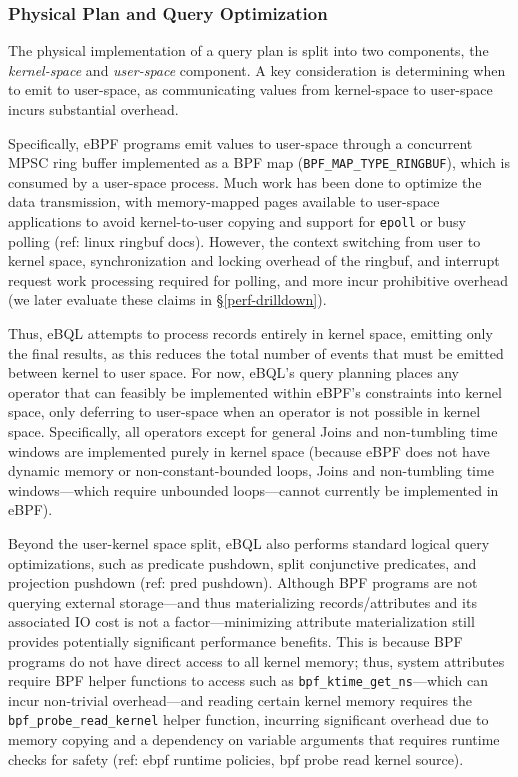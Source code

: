 \subsubsection{Physical Plan and Query Optimization}

The physical implementation of a query plan is split into two components, the \textit{kernel-space}
and \textit{user-space} component. A key consideration is determining when to emit to user-space, as
communicating values from kernel-space to user-space incurs substantial overhead.

Specifically, eBPF programs emit values to user-space through a concurrent MPSC ring buffer
implemented as a BPF map (\texttt{BPF\_MAP\_TYPE\_RINGBUF}), which is consumed by a user-space
process. Much work has been done to optimize the data transmission, with memory-mapped pages
available to user-space applications to avoid kernel-to-user copying and support for \texttt{epoll}
or busy polling (ref: linux ringbuf docs). However, the context switching from user to kernel space,
synchronization and locking overhead of the ringbuf, and interrupt request work processing required
for polling, and more incur prohibitive overhead (we later evaluate these claims in
\S\ref{perf-drilldown}).

Thus, eBQL attempts to process records entirely in kernel space, emitting only the final results, as
this reduces the total number of events that must be emitted between kernel to user space. For now,
eBQL's query planning places any operator that can feasibly be implemented within eBPF's constraints
into kernel space, only deferring to user-space when an operator is not possible in kernel space.
Specifically, all operators except for general Joins and non-tumbling time windows are implemented
purely in kernel space (because eBPF does not have dynamic memory or non-constant-bounded loops,
Joins and non-tumbling time windows---which require unbounded loops---cannot currently be
implemented in eBPF).

Beyond the user-kernel space split, eBQL also performs standard logical query optimizations, such as
predicate pushdown, split conjunctive predicates, and projection pushdown (ref: pred pushdown).
Although BPF programs are not querying external storage---and thus materializing records/attributes
and its associated IO cost is not a factor---minimizing attribute materialization still provides
potentially significant performance benefits. This is because BPF programs do not have direct access
to all kernel memory; thus, system attributes require BPF helper functions to access such as
\texttt{bpf\_ktime\_get\_ns}---which can incur non-trivial overhead---and reading certain kernel
memory requires the \texttt{bpf\_probe\_read\_kernel} helper function, incurring significant
overhead due to memory copying and a dependency on variable arguments that requires runtime checks
for safety (ref: ebpf runtime policies, bpf probe read kernel source).

